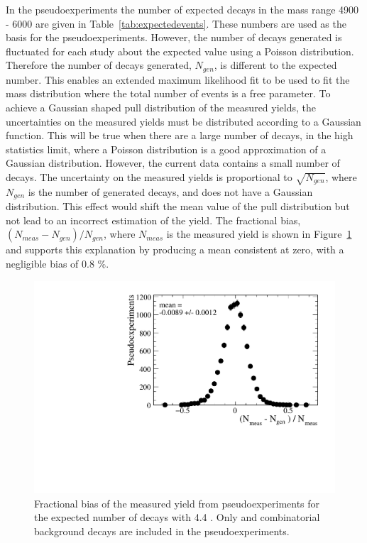 In the pseudoexperiments the number of expected decays in the mass range 4900 - 6000 \mevcc are given in Table~\ref{tab:expectedevents}. These numbers are used as the basis for the pseudoexperiments. However, the number of decays generated is fluctuated for each study about the expected value using a Poisson distribution. Therefore the number of decays generated, $N_{gen}$, is different to the expected number. This enables an extended maximum likelihood fit to be used to fit the mass distribution where the total number of events is a free parameter. To achieve a Gaussian shaped pull distribution of the measured \bsmumu yields, the uncertainties on the measured yields must be distributed according to a Gaussian function. This will be true when there are a large number of \bsmumu decays, in the high statistics limit, where a Poisson distribution is a good approximation of a Gaussian distribution. However, the current data contains a small number of \bsmumu decays. The uncertainty on the measured yields is proportional to $\sqrt{N_{gen}}$, where $N_{gen}$ is the number of generated decays, and does not have a Gaussian distribution. This effect would shift the mean value of the pull distribution but not lead to an incorrect estimation of the \bsmumu yield. The fractional bias, $(N_{meas} - N_{gen})/N_{gen}$, where $N_{meas}$ is the measured \bsmumu yield is shown in Figure~\ref{fig:FracBias} and supports this explanation by producing a mean consistent at zero, with a negligible bias of 0.8 $\%$. 

\begin{figure}[tbp]
    \centering
        \includegraphics[width=0.6 \textwidth]{./Figs/LifetimeSystematics/Fractional_bias_Bsmumu_yield_CKM.pdf}
    \caption{Fractional bias of the measured \bsmumu yield from pseudoexperiments for the expected number of decays with 4.4 \fb. Only \bsmumu and combinatorial background decays are included in the pseudoexperiments.}
    \label{fig:FracBias}
\end{figure}


